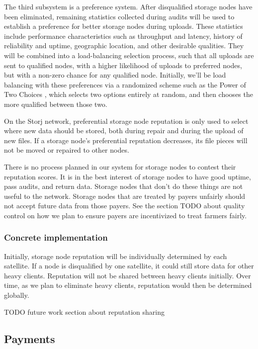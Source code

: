 \documentclass[a4paper,10pt]{article} \usepackage[utf8]{inputenc}
\newcommand{\todo}[1]{{\color{red} TODO #1 }}
\begin{document}
The third subsystem is a preference system. After disqualified storage nodes
have been eliminated, remaining statistics collected during audits
will be used to establish a preference for better storage nodes during uploads.
These statistics include performance characteristics such as throughput and
latency, history of reliability and uptime, geographic location, and other
desirable qualities.
They will be combined into a load-balancing selection process, such
that all uploads are sent to qualified nodes, with a higher likelihood of
uploads to preferred nodes, but with a non-zero chance for any qualified node.
Initially, we'll be load balancing with these preferences via a randomized
scheme such as the Power of Two Choices \cite{power-of-two-choices}, which
selects two options entirely at random, and then chooses the more qualified
between those two.

On the Storj network, preferential storage node reputation is only used to
select where new data should be stored, both during repair and during the
upload of new files.
If a storage node's preferential reputation decreases, its file pieces will not
be moved or repaired to other nodes.

There is no process planned in our system for storage nodes to contest their
reputation scores. It is in the best interest of storage nodes to have good
uptime, pass audits, and return data. Storage nodes that don't do these things
are not useful to the network. Storage nodes that are treated by payers unfairly
should not accept future data from those payers. See the section \todo{} about
quality control on how we plan to ensure payers are incentivized to treat
farmers fairly.

\subsubsection{Concrete implementation}

Initially, storage node reputation will be individually determined by each
satellite. If a node is disqualified by one satellite, it could still
store data for other heavy clients. Reputation will not be shared between
heavy clients initially. Over time, as we plan to eliminate heavy clients,
reputation would then be determined globally.

\todo{future work section about reputation sharing}

\subsection{Payments}
\end{document}
